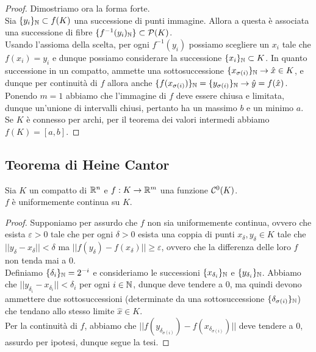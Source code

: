 \documentclass{article}
\begin{document}
\begin{proof}
    Dimostriamo ora la forma forte.\\
    Sia $\{y_i\}_{\mathbb{N}} \subset f(K)$ una successione di punti immagine. Allora a questa è associata una successione di fibre $\{f^{-1}(y_i)_{\mathbb{N}}\} \subset \mathcal{P}(K)$.\\
    Usando l'assioma della scelta, per ogni $f^{-1}(y_i)$ possiamo scegliere un $x_i$ tale che $f(x_i) = y_i$ e dunque possiamo considerare la successione $\{x_i\}_{\mathbb{N}} \subset K$. In quanto successione in un compatto, ammette una sottosuccessione $\{x_{\sigma(i)}\}_{\mathbb{N}}\to\hat{x}\in K$, e dunque per continuità di $f$ allora anche $\{f(x_{\sigma(i)})\}_{\mathbb{N}} = \{y_{\sigma(i)}\}_{\mathbb{N}} \to \hat{y} = f(\hat{x})$.\\
    Ponendo $m=1$ abbiamo che l'immagine di $f$ deve essere chiusa e limitata, dunque un'unione di intervalli chiusi, pertanto ha un massimo $b$ e un minimo $a$.\\
    Se $K$ è connesso per archi, per il teorema dei valori intermedi abbiamo $f(K)=[a,b]$.
\end{proof}
\subsection{Teorema di Heine Cantor}

\begin{theorem}{}{}
    Sia $K$ un compatto di $\mathbb{R}^n$ e $f : K \to \mathbb{R}^m$ una funzione $\mathcal{C}^0(K)$.\\
    $f$ è uniformemente continua su $K$.
\end{theorem}
\begin{proof}
    Supponiamo per assurdo che $f$ non sia uniformemente continua, ovvero che esista $\varepsilon>0$ tale che per ogni $\delta>0$ esista una coppia di punti $x_\delta, y_\delta \in K$ tale che $||y_\delta - x_\delta||<\delta$ ma $||f(y_\delta) - f(x_\delta)||\ge \varepsilon$, ovvero che la differenza delle loro $f$ non tenda mai a $0$.\\
    Definiamo $\{\delta_{i}\}_{\mathbb{N}} = 2^{-i}$ e consideriamo le successioni $\{x_{\delta_i}\}_{\mathbb{N}}$ e $\{y_{\delta_i}\}_{\mathbb{N}}$. Abbiamo che $||y_{\delta_i} - x_{\delta_i}||<\delta_i$ per ogni $i \in \mathbb{N}$, dunque deve tendere a 0, ma quindi devono ammettere due sottosuccessioni (determinate da una sottosuccessione $\{\delta_{\sigma(i)}\}_{\mathbb{N}}$) che tendano allo stesso limite $\hat{x} \in K$.\\
    Per la continuità di $f$, abbiamo che $||f(y_{\delta_{\sigma(i)}}) - f(x_{\delta_{\sigma(i)}})||$ deve tendere a $0$, assurdo per ipotesi, dunque segue la tesi. 
\end{proof}
\end{document}

